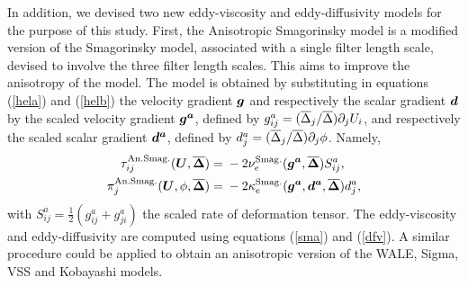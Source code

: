In addition, we devised two new eddy-viscosity and eddy-diffusivity models
for the purpose of this study.
First, the Anisotropic Smagorinsky model is a modified version of the Smagorinsky model,
associated with a single
filter length scale, devised to involve the three filter length scales.
This aims to improve the anisotropy of the model.
The model is obtained by substituting in equations
(\ref{hela}) and (\ref{helb}) the velocity gradient $\vv{g}$
 and respectively the scalar
gradient $\vv{d}$
by the
scaled velocity gradient $\vv{g^a}$, defined by $g^a_{ij} = (\f{\Delta}_j/\f{\Delta}) \partial_j U_i$,
and respectively
the scaled scalar gradient $\vv{d^a}$, defined by $d^a_j = (\f{\Delta}_j/\f{\Delta}) \partial_j \phi$.
Namely,
\begin{align}
\tau_{ij}^{\mathrm{An. Smag.}}(\vv{U}, \vv{\f{\Delta}}) ={}& - 2 \nu_e^{\mathrm{Smag.}}(\vv{g^a}, \vv{\f{\Delta}}) S^a_{ij}, \\
\pi_{j}^{\mathrm{An. Smag.}}(\vv{U}, \phi, \vv{\f{\Delta}}) ={}& - 2 \kappa_e^{\mathrm{Smag.}}(\vv{g^a}, \vv{d^a}, \vv{\f{\Delta}}) d^a_j,
\end{align}
with $S^a_{ij} = \tfrac{1}{2}\left( g^a_{ij} + g^a_{ji} \right)$ the scaled rate of deformation tensor.
The eddy-viscosity and eddy-diffusivity are computed using equations (\ref{sma}) and (\ref{dfv}).
A similar procedure could be applied to obtain an anisotropic version
of the
WALE,
Sigma,
VSS and
Kobayashi models.

